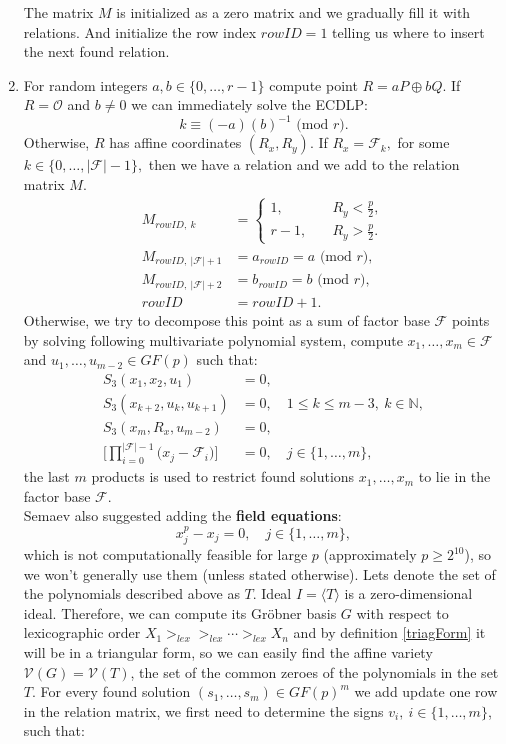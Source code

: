 \documentclass[thesis=M,english]{FITthesis}[2012/10/20]
\theoremstyle{remark}
\theoremstyle{definition}
\begin{document}
\begin{enumerate}
The matrix $M$ is initialized as a zero matrix and we gradually fill it with relations. And initialize the row index $rowID = 1$ telling us where to insert the next found relation.
\item For random integers $a,b \in \{0, \ldots, r-1\}$ compute point ${R = aP \oplus bQ.}$ If $R = \mathcal{O}$ and $b \neq 0$ we can immediately solve the ECDLP:
$$k \equiv  (-a)(b)^{-1} \text{ (mod $r$)}.$$ Otherwise, $R$ has affine coordinates $(R_x, R_y)$. If $R_x = \mathcal{F}_k,$ for some $k \in \{0,\ldots,|\mathcal{F}| - 1\},$ then we have a relation and we add to the relation matrix $M$.
\begin{align*}
M_{rowID,\ k} &=\begin{cases} 1, \quad &R_y < \frac{p}{2}, \\
r-1, \quad &R_y > \frac{p}{2}.
\end{cases}\\
M_{rowID,\ |\mathcal{F}| + 1} &= a_{rowID} = a \text{ (mod $r$)}, \\
M_{rowID,\ |\mathcal{F}| + 2} &= b_{rowID} = b \text{ (mod $r$)}, \\
rowID &= rowID + 1.
\end{align*}
Otherwise, we try to decompose this point as a sum of factor base $\mathcal{F}$ points by solving following multivariate polynomial system, compute $x_1,\ldots,x_m \in \mathcal{F}$ and $u_1,\ldots,u_{m-2} \in GF(p)$ such that:
\begin{align*}
S_3(x_1,x_2,u_1) &= 0, \\
S_3(x_{k+2},u_k,u_{k+1}) &= 0,\quad 1 \leq k \leq m - 3,\ k \in \mathbb{N}, \\
S_3(x_m,R_x,u_{m-2}) &= 0, \\
\Bigg[\prod_{i=0}^{|\mathcal{F}| -1}\Big(x_j - \mathcal{F}_i\Big)\Bigg] &= 0, \quad  j \in \{1, \ldots, m\},
\end{align*}
the last $m$ products is used to restrict found solutions $x_1,\ldots,x_m$ to lie in the factor base $\mathcal{F}$. \\ 
\noindent Semaev also suggested adding the \textbf{field equations}:
$$
x_j^p - x_j = 0, \quad j \in \{1, \ldots, m\},
$$
which is not computationally feasible for large $p$ (approximately $p \geq 2^{10}$), so we won't generally use them (unless stated otherwise). Lets denote the set of the polynomials described above as $T$. Ideal $I = \langle T \rangle$ is a zero-dimensional ideal. Therefore, we can compute its Gröbner basis $G$ with respect to lexicographic order $X_1 >_{lex} >_{lex} \cdots >_{lex} X_n$ and by definition \ref{triagForm} it will be in a triangular form, so we can easily find the affine variety $\mathcal{V}(G) = \mathcal{V}(T)$, the set of the common zeroes of the polynomials in the set $T$. For every found solution ${(s_1, \ldots, s_m) \in GF(p)^m}$ we add update one row in the relation matrix, we first need to determine the signs $v_i,\ i \in \{1,\ldots,m\}$, such that:

\end{enumerate}
\end{document}
